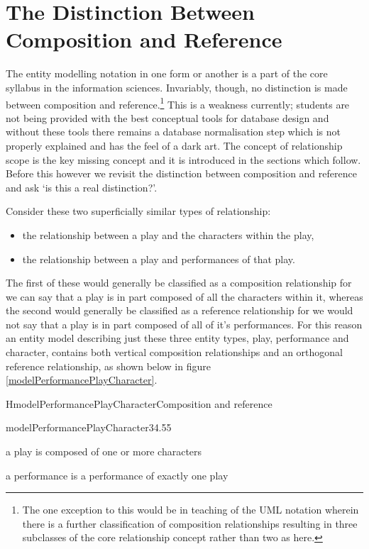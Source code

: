 
\section{The Distinction Between Composition and Reference}
\label{DistinctionBetweenCompositionAndReference}

The entity modelling notation in one form or another is a part of the core syllabus in the information sciences. Invariably, though, no distinction is made between composition and reference.\footnote{
The one exception to this would be in teaching of the UML notation wherein there is a further classification of composition relationships resulting in three subclasses of the core relationship concept rather than two as here.} This is a weakness currently; students are not being provided with the best conceptual tools for database design and without these tools there remains a database normalisation step which is not properly explained and has the feel of a dark art. The concept of relationship scope is the key missing concept and it is introduced in the sections which follow. Before this however we revisit the distinction between composition and reference and ask ‘is this a real distinction?’.

Consider these two superficially similar types of relationship:
\begin{itemize}
\item the relationship between a play and the characters within the play,
\item the relationship between a play and performances of that play.
\end{itemize}
The first of these would generally be classified as a composition relationship for we can say that a play is in part composed of all the characters within it, whereas the second would generally be classified as a reference relationship for we would not say that a play is in part composed of all of it's performances. For this reason an entity model describing just these three entity types, play, performance and character, contains both vertical composition relationships and an orthogonal reference relationship, as shown below in figure \ref{modelPerformancePlayCharacter}.

\begin{erboxedFigure}{H}{modelPerformancePlayCharacter}{Composition and reference}
\begin{erbulletedModel}{modelPerformancePlayCharacter}{3}{4.5}{5}
\item a play is composed of one or more characters
\item a performance is a performance of exactly one play
\end{erbulletedModel}
\end{erboxedFigure}

